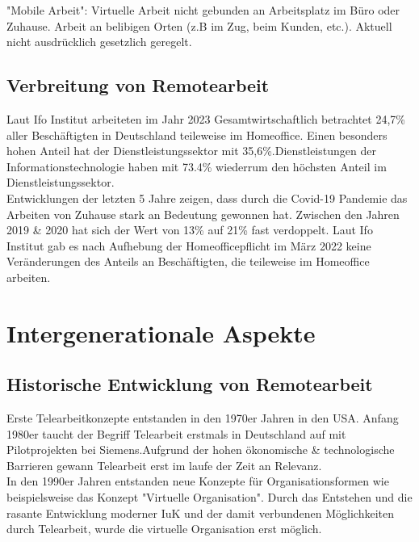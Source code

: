 \documentclass[runningheads]{llncs}
\begin{document}
"Mobile Arbeit": Virtuelle Arbeit nicht gebunden an Arbeitsplatz im Büro oder Zuhause\cite{bundestag}. Arbeit an belibigen Orten (z.B im Zug, beim Kunden, etc.). Aktuell nicht ausdrücklich gesetzlich geregelt\cite{bundestag}.

\subsection{Verbreitung von Remotearbeit}
Laut Ifo Institut arbeiteten im Jahr 2023 Gesamtwirtschaftlich betrachtet 24,7\% aller Beschäftigten in Deutschland teileweise im Homeoffice\cite{ifo23}. Einen besonders hohen Anteil hat der Dienstleistungssektor mit 35,6\%\cite{ifo23}.Dienstleistungen der Informationstechnologie haben mit 73.4\% wiederrum den höchsten Anteil im Dienstleistungssektor\cite{ifo23}.\\
Entwicklungen der letzten 5 Jahre zeigen, dass durch die Covid-19 Pandemie das Arbeiten von Zuhause stark an Bedeutung gewonnen hat. Zwischen den Jahren 2019 \& 2020 hat sich der Wert von 13\% auf 21\% fast verdoppelt\cite{statis23}. Laut Ifo Institut gab es nach Aufhebung der Homeofficepflicht im März 2022 keine Veränderungen des Anteils an Beschäftigten, die teileweise im Homeoffice arbeiten\cite{ifo23}.

\section{Intergenerationale Aspekte}

\subsection{Historische Entwicklung von Remotearbeit}
Erste Telearbeitkonzepte entstanden in den 1970er Jahren in den USA\cite{Dangelmaier.1999}. Anfang 1980er taucht der Begriff Telearbeit erstmals in Deutschland auf mit Pilotprojekten bei Siemens\cite{Dangelmaier.1999}.Aufgrund der hohen ökonomische \& technologische Barrieren gewann Telearbeit erst im laufe der Zeit an Relevanz\cite{Dangelmaier.1999}.\\
In den 1990er Jahren entstanden neue Konzepte für Organisationsformen wie beispielsweise das Konzept "Virtuelle Organisation"\cite{Siedenbiedel.2020}. Durch das Entstehen und die rasante Entwicklung moderner IuK und der damit verbundenen Möglichkeiten durch Telearbeit, wurde die virtuelle Organisation erst möglich\cite{Siedenbiedel.2020}.
\end{document}
